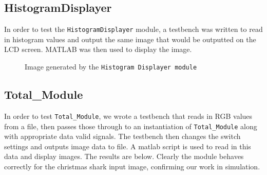\documentclass[12pt]{article}
\begin{document}
  \subsection{HistogramDisplayer}
  In order to test the \texttt{HistogramDisplayer} module, a testbench was written to read in histogram values and output the same image that would be outputted on the LCD screen. MATLAB was then used to display the image.
  \begin{figure}[H]
    \caption{Image generated by the \texttt{Histogram Displayer module}}
    \label{fig:histogram_displayer_testbench}
  \end{figure} 
  
  \newpage
  \subsection{Total\_Module}
  In order to test \texttt{Total\_Module}, we wrote a testbench that reads in RGB values from a file, then passes those through to an instantiation of \texttt{Total\_Module} along with appropriate data valid signals. The testbench then changes the switch settings and outputs image data to file. A matlab script is used to read in this data and display images. The results are below. Clearly the module behaves correctly for the christmas shark input image, confirming our work in simulation.
\end{document}
